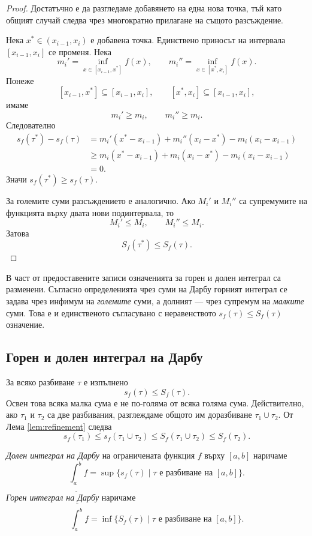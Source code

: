 \begin{proof}
Достатъчно е да разгледаме добавянето на една нова точка, тъй като общият случай следва чрез многократно прилагане на същото разсъждение.

Нека $x^*\in(x_{i-1},x_i)$ е добавена точка. Единствено приносът на интервала $[x_{i-1},x_i]$ се променя. Нека
\[
m_i'=\inf_{x\in[x_{i-1},x^*]}f(x),
\qquad
m_i''=\inf_{x\in[x^*,x_i]}f(x).
\]
Понеже
\[
[x_{i-1},x^*]\subseteq[x_{i-1},x_i],
\qquad
[x^*,x_i]\subseteq[x_{i-1},x_i],
\]
имаме
\[
m_i'\geq m_i,
\qquad
m_i''\geq m_i.
\]
Следователно
\begin{align*}
s_f(\tau^*)-s_f(\tau)
&=m_i'(x^*-x_{i-1})+m_i''(x_i-x^*)-m_i(x_i-x_{i-1})\\
&\geq m_i(x^*-x_{i-1})+m_i(x_i-x^*)-m_i(x_i-x_{i-1})\\
&=0.
\end{align*}
Значи $s_f(\tau^*)\geq s_f(\tau)$.

За големите суми разсъждението е аналогично. Ако $M_i'$ и $M_i''$ са супремумите на функцията върху двата нови подинтервала, то
\[
M_i'\leq M_i,\qquad M_i''\leq M_i.
\]
Затова
\[
S_f(\tau^*)\leq S_f(\tau).
\]
\end{proof}

\begin{supp}[Бележка]
В част от предоставените записи означенията за горен и долен интеграл са разменени. Съгласно определенията чрез суми на Дарбу горният интеграл се задава чрез инфимум на \emph{големите} суми, а долният --- чрез супремум на \emph{малките} суми. Това е и единственото съгласувано с неравенството $s_f(\tau)\leq S_f(\tau)$ означение.
\end{supp}

\subsection{Горен и долен интеграл на Дарбу}\label{s:33.1.3}

За всяко разбиване $\tau$ е изпълнено
\[
s_f(\tau)\leq S_f(\tau).
\]
Освен това всяка малка сума е не по-голяма от всяка голяма сума. Действително, ако $\tau_1$ и $\tau_2$ са две разбивания, разглеждаме общото им доразбиване $\tau_1\cup\tau_2$. От Лема \ref{lem:refinement} следва
\[
s_f(\tau_1)\leq s_f(\tau_1\cup\tau_2)\leq S_f(\tau_1\cup\tau_2)\leq S_f(\tau_2).
\]

\begin{defn}
\emph{Долен интеграл на Дарбу} на ограничената функция $f$ върху $[a,b]$ наричаме
\[
\underline{\int_a^b} f
=
\sup\{s_f(\tau)\mid \tau\text{ е разбиване на }[a,b]\}.
\]
\emph{Горен интеграл на Дарбу} наричаме
\[
\overline{\int_a^b} f
=
\inf\{S_f(\tau)\mid \tau\text{ е разбиване на }[a,b]\}.
\]
\end{defn}

